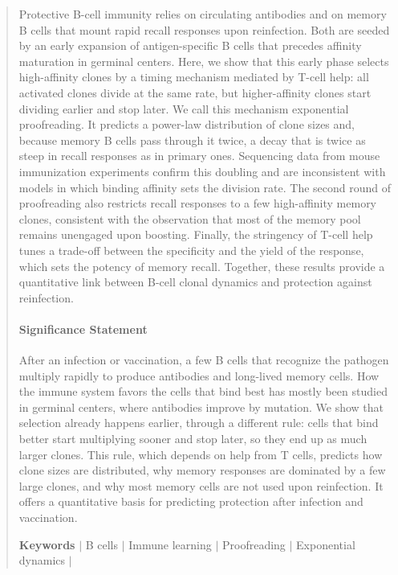 \documentclass[aps, pre, twocolumn, 10pt, groupedaddress, superscriptaddress, linenumbers]{revtex4-2}
\begin{document}
\begin{abstract}
Protective B-cell immunity relies on circulating antibodies and on memory B cells that mount rapid recall responses upon reinfection.
Both are seeded by an early expansion of antigen-specific B cells that precedes affinity maturation in germinal centers.
Here, we show that this early phase selects high-affinity clones by a timing mechanism mediated by T-cell help: all activated clones divide at the same rate, but higher-affinity clones start dividing earlier and stop later.
We call this mechanism exponential proofreading.
It predicts a power-law distribution of clone sizes and, because memory B cells pass through it twice, a decay that is twice as steep in recall responses as in primary ones.
Sequencing data from mouse immunization experiments confirm this doubling and are inconsistent with models in which binding affinity sets the division rate.
The second round of proofreading also restricts recall responses to a few high-affinity memory clones, consistent with the observation that most of the memory pool remains unengaged upon boosting.
Finally, the stringency of T-cell help tunes a trade-off between the specificity and the yield of the response, which sets the potency of memory recall.
Together, these results provide a quantitative link between B-cell clonal dynamics and protection against reinfection.
\\
\paragraph*{\bf Significance Statement}
{\small After an infection or vaccination, a few B cells that recognize the pathogen multiply rapidly to produce antibodies and long-lived memory cells.
How the immune system favors the cells that bind best has mostly been studied in germinal centers, where antibodies improve by mutation.
We show that selection already happens earlier, through a different rule: cells that bind better start multiplying sooner and stop later, so they end up as much larger clones.
This rule, which depends on help from T cells, predicts how clone sizes are distributed, why memory responses are dominated by a few large clones, and why most memory cells are not used upon reinfection.
It offers a quantitative basis for predicting protection after infection and vaccination.}
\begin{center}
    \textbf{Keywords}  $|$ B cells $|$ Immune learning  $|$ Proofreading $|$ Exponential dynamics $|$ 
\end{center}
\end{abstract}
\maketitle
\end{document}
